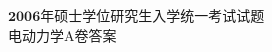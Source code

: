 \begin{center}
	\heiti
	\LARGE{$\boldsymbol{2006}$年硕士学位研究生入学统一考试试题\\
	电动力学A卷答案}

\end{center}
\noindent